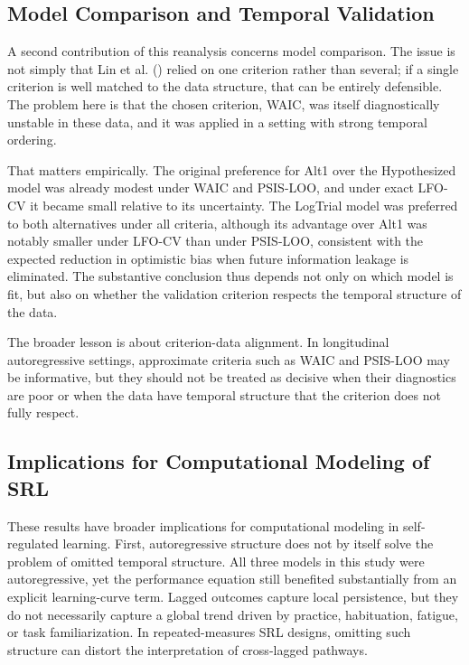 \documentclass[
  man,
  floatsintext,
  longtable,
  nolmodern,
  notxfonts,
  notimes,
  colorlinks=true,linkcolor=blue,citecolor=blue,urlcolor=blue]{apa7}
\begin{document}
\subsection{Model Comparison and Temporal
Validation}\label{model-comparison-and-temporal-validation}

A second contribution of this reanalysis concerns model comparison. The
issue is not simply that Lin et al. ()
relied on one criterion rather than several; if a single criterion is
well matched to the data structure, that can be entirely defensible. The
problem here is that the chosen criterion, WAIC, was itself
diagnostically unstable in these data, and it was applied in a setting
with strong temporal ordering.

That matters empirically. The original preference for Alt1 over the
Hypothesized model was already modest under WAIC and PSIS-LOO, and under
exact LFO-CV it became small relative to its uncertainty. The LogTrial
model was preferred to both alternatives under all criteria, although
its advantage over Alt1 was notably smaller under LFO-CV than under
PSIS-LOO, consistent with the expected reduction in optimistic bias when
future information leakage is eliminated. The substantive conclusion
thus depends not only on which model is fit, but also on whether the
validation criterion respects the temporal structure of the data.

The broader lesson is about criterion-data alignment. In longitudinal
autoregressive settings, approximate criteria such as WAIC and PSIS-LOO
may be informative, but they should not be treated as decisive when
their diagnostics are poor or when the data have temporal structure that
the criterion does not fully respect.

\subsection{Implications for Computational Modeling of
SRL}\label{implications-for-computational-modeling-of-srl}

These results have broader implications for computational modeling in
self-regulated learning. First, autoregressive structure does not by
itself solve the problem of omitted temporal structure. All three models
in this study were autoregressive, yet the performance equation still
benefited substantially from an explicit learning-curve term. Lagged
outcomes capture local persistence, but they do not necessarily capture
a global trend driven by practice, habituation, fatigue, or task
familiarization. In repeated-measures SRL designs, omitting such
structure can distort the interpretation of cross-lagged pathways.
\end{document}
